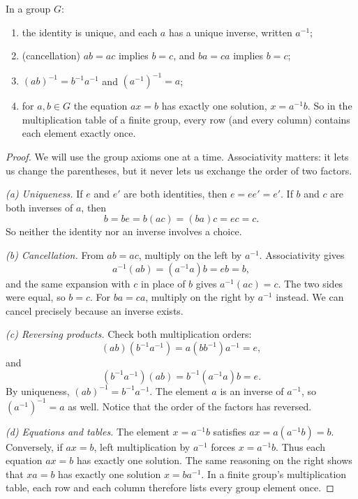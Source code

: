 \begin{proposition}\label{prop:rules}
In a group $G$:
\begin{enumerate}[label=(\alph*)]
\item the identity is unique, and each $a$ has a unique inverse, written $a^{-1}$;
\item (cancellation) $ab=ac$ implies $b=c$, and $ba=ca$ implies $b=c$;
\item $(ab)^{-1}=b^{-1}a^{-1}$ and $(a^{-1})^{-1}=a$;
\item for $a,b\in G$ the equation $ax=b$ has exactly one solution, $x=a^{-1}b$. So in the multiplication table of a finite group, every row (and every column) contains each element exactly once.
\end{enumerate}
\end{proposition}
\begin{proof}
We will use the group axioms one at a time. Associativity matters:
it lets us change the parentheses, but it never lets us exchange the
order of two factors.

\emph{(a) Uniqueness.} If $e$ and $e'$ are both identities, then
$e=ee'=e'$. If $b$ and $c$ are both inverses of $a$, then
\[
b=be=b(ac)=(ba)c=ec=c.
\]
So neither the identity nor an inverse involves a choice.

\emph{(b) Cancellation.} From $ab=ac$, multiply on the left by
$a^{-1}$. Associativity gives
\[
a^{-1}(ab)=(a^{-1}a)b=eb=b,
\]
and the same expansion with $c$ in place of $b$ gives $a^{-1}(ac)=c$. The two sides were equal, so $b=c$.
For $ba=ca$, multiply on the right by $a^{-1}$ instead. We can
cancel precisely because an inverse exists.

\emph{(c) Reversing products.} Check both multiplication orders:
\[
(ab)(b^{-1}a^{-1})=a(bb^{-1})a^{-1}=e,
\]
and
\[
(b^{-1}a^{-1})(ab)=b^{-1}(a^{-1}a)b=e.
\]
By uniqueness, $(ab)^{-1}=b^{-1}a^{-1}$. The element $a$ is an
inverse of $a^{-1}$, so $(a^{-1})^{-1}=a$ as well. Notice that
the order of the factors has reversed.

\emph{(d) Equations and tables.} The element $x=a^{-1}b$
satisfies $ax=a(a^{-1}b)=b$. Conversely, if $ax=b$, left
multiplication by $a^{-1}$ forces $x=a^{-1}b$. Thus each
equation $ax=b$ has exactly one solution. The same reasoning
on the right shows that $xa=b$ has exactly one solution
$x=ba^{-1}$. In a finite group's multiplication table, each row
and each column therefore lists every group element once.
\end{proof}

